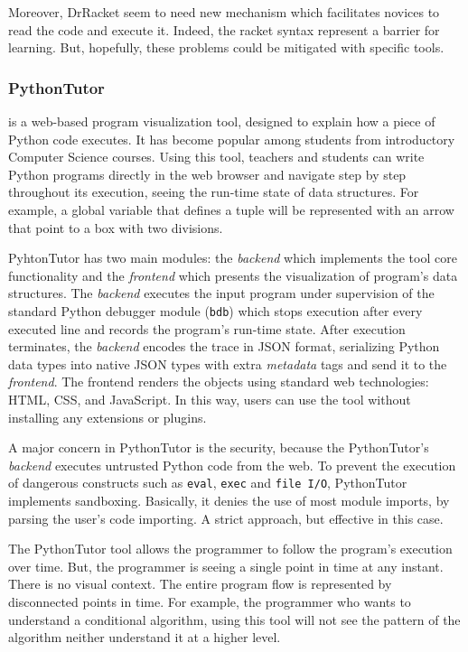 Moreover, DrRacket seem to need new mechanism which facilitates novices to read the code and execute it. Indeed, the racket syntax represent a barrier for learning. But, hopefully, these problems could be mitigated with specific tools.
\subsubsection{PythonTutor~\cite{GuoSIGCSE2013}} is a web-based program visualization tool, designed to explain how a piece of Python code executes. It has become popular among students from introductory Computer Science courses. Using this tool, teachers and students can write Python programs directly in the web browser and navigate step by step throughout its execution, seeing the run-time state of data structures. For example, a global variable that defines a tuple will be represented with an arrow that point to a box with two divisions.

PyhtonTutor has two main modules: the \textit{backend} which implements the tool core functionality and the \textit{frontend} which presents the visualization of program's data structures. The \textit{backend} executes the input program under supervision of the standard Python debugger module (\texttt{bdb}) which stops execution after every executed line and records the program's run-time state. After execution terminates, the \textit{backend} encodes the trace in JSON format, serializing Python data types into native JSON types with extra \textit{metadata} tags and send it to the \textit{frontend}. The frontend renders the objects using standard web technologies: HTML, CSS, and JavaScript. In this way, users can use the tool without installing any extensions or plugins.

A major concern in PythonTutor is the security, because the PythonTutor's \textit{backend} executes untrusted Python code from the web. To prevent the execution of dangerous constructs such as {\tt eval}, {\tt exec} and {\tt file I/O}, PythonTutor implements sandboxing. Basically, it denies the use of most module imports, by parsing the user's code importing. A strict approach, but effective in this case.

The PythonTutor tool allows the programmer to follow the program's execution over time. But, the programmer is seeing a single point in time at any instant. There is no visual context. The entire program flow is represented by disconnected points in time. For example, the programmer who wants to understand a conditional algorithm, using this tool will not see the pattern of the algorithm neither understand it at a higher level.
